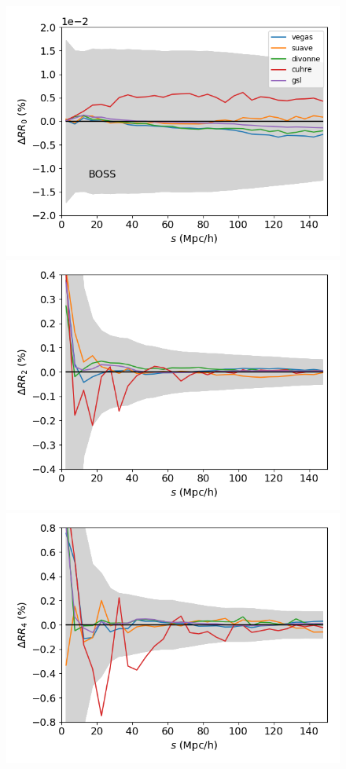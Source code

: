 \documentclass{aa}
\begin{document}
\begin{figure}
\includegraphics[width=0.96\columnwidth]{Figures/reldif_RR_randoms_boss_map_nside8192_nside8192_N_30000000_1e-5_l0.png} 
\includegraphics[width=0.96\columnwidth]{Figures/reldif_RR_randoms_boss_map_nside8192_nside8192_N_30000000_1e-5_l2.png} 
\includegraphics[width=0.96\columnwidth]{Figures/reldif_RR_randoms_boss_map_nside8192_nside8192_N_30000000_1e-5_l4.png} 

\end{figure}
\end{document}

